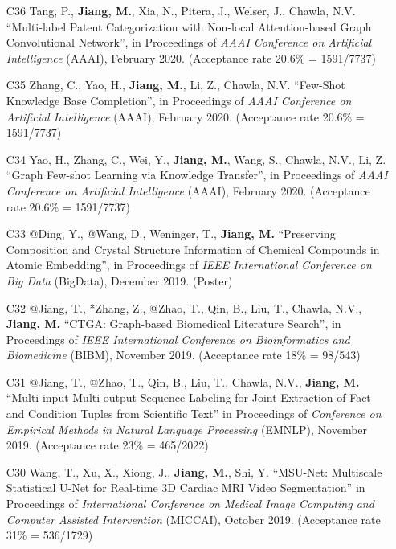 \documentclass[10pt]{article}
\newenvironment{myindentpar}[1]%
{\begin{list}{}%
         {\setlength{\leftmargin}{#1}}%
         \item[]%
}
{\end{list}}
\newcounter{list}
\begin{document}
\begin{myindentpar}{0.00cm}
\begin{enumerate}[leftmargin=.5cm]
\item[C36] Tang, P., \textbf{Jiang, M.}, Xia, N., Pitera, J., Welser, J., Chawla, N.V. ``Multi-label Patent Categorization with Non-local Attention-based Graph Convolutional Network'', in Proceedings of \textit{AAAI Conference on Artificial Intelligence} (AAAI), February 2020. (Acceptance rate 20.6\% = 1591/7737)
	
\item[C35] Zhang, C., Yao, H., \textbf{Jiang, M.}, Li, Z., Chawla, N.V. ``Few-Shot Knowledge Base Completion'', in Proceedings of \textit{AAAI Conference on Artificial Intelligence} (AAAI), February 2020. (Acceptance rate 20.6\% = 1591/7737)

\item[C34] Yao, H., Zhang, C., Wei, Y., \textbf{Jiang, M.}, Wang, S., Chawla, N.V., Li, Z. ``Graph Few-shot Learning via Knowledge Transfer'', in Proceedings of \textit{AAAI Conference on Artificial Intelligence} (AAAI), February 2020. (Acceptance rate 20.6\% = 1591/7737)

\item[C33] @Ding, Y., @Wang, D., Weninger, T., \textbf{Jiang, M.} ``Preserving Composition and Crystal Structure Information of Chemical Compounds in Atomic Embedding'', in Proceedings of \textit{IEEE International Conference on Big Data} (BigData), December 2019. (Poster)

\item[C32] @Jiang, T., *Zhang, Z., @Zhao, T., Qin, B., Liu, T., Chawla, N.V., \textbf{Jiang, M.} ``CTGA: Graph-based Biomedical Literature Search'', in Proceedings of \textit{IEEE International Conference on Bioinformatics and Biomedicine} (BIBM), November 2019. (Acceptance rate 18\% = 98/543)

\item[C31] @Jiang, T., @Zhao, T., Qin, B., Liu, T., Chawla, N.V., \textbf{Jiang, M.} ``Multi-input Multi-output Sequence Labeling for Joint Extraction of Fact and Condition Tuples from Scientific Text'' in Proceedings of \textit{Conference on Empirical Methods in Natural Language Processing} (EMNLP), November 2019. (Acceptance rate 23\% = 465/2022)

\item[C30] Wang, T., Xu, X., Xiong, J., \textbf{Jiang, M.}, Shi, Y. ``MSU-Net: Multiscale Statistical U-Net for Real-time 3D Cardiac MRI Video Segmentation'' in Proceedings of \textit{International Conference on Medical Image Computing and Computer Assisted Intervention} (MICCAI), October 2019. (Acceptance rate 31\% = 536/1729)


\end{enumerate}
\end{myindentpar}
\end{document}
